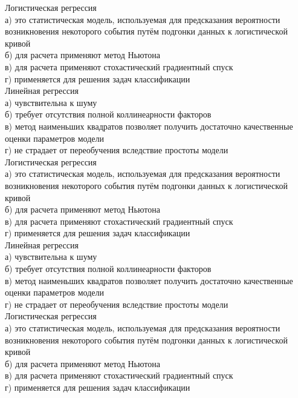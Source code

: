 \documentclass[10pt,a4paper]{article}
\begin{document}
\noindent Логистическая регрессия \\
а) это статистическая модель, используемая для предсказания вероятности возникновения некоторого события путём подгонки данных к логистической кривой \\
б) для расчета применяют метод Ньютона \\
в) для расчета применяют стохастический градиентный спуск \\
г) применяется для решения задач классификации \\

\vspace{1em}
\noindent Линейная регрессия \\
а) чувствительна к шуму \\
б) требует отсутствия полной коллинеарности факторов \\
в) метод наименьших квадратов позволяет получить достаточно качественные оценки параметров модели \\
г) не страдает от переобучения вследствие простоты модели \\

\noindent Логистическая регрессия \\
а) это статистическая модель, используемая для предсказания вероятности возникновения некоторого события путём подгонки данных к логистической кривой \\
б) для расчета применяют метод Ньютона \\
в) для расчета применяют стохастический градиентный спуск \\
г) применяется для решения задач классификации \\

\vspace{1em}
\noindent Линейная регрессия \\
а) чувствительна к шуму \\
б) требует отсутствия полной коллинеарности факторов \\
в) метод наименьших квадратов позволяет получить достаточно качественные оценки параметров модели \\
г) не страдает от переобучения вследствие простоты модели \\

\noindent Логистическая регрессия \\
а) это статистическая модель, используемая для предсказания вероятности возникновения некоторого события путём подгонки данных к логистической кривой \\
б) для расчета применяют метод Ньютона \\
в) для расчета применяют стохастический градиентный спуск \\
г) применяется для решения задач классификации 
\end{document}
